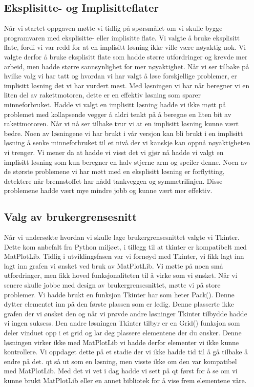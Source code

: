 \subsection{Eksplisitte- og Implisitteflater}
Når vi startet oppgaven møtte vi tidlig på spørsmålet om vi skulle bygge programvaren med eksplisitte- eller implisitte flate. Vi valgte å bruke eksplisitt flate, fordi vi var redd for at en implisitt løsning ikke ville være nøyaktig nok. Vi valgte derfor å bruke eksplisitt flate som hadde større utfordringer og krevde mer arbeid, men hadde større sannsynlighet for mer nøyaktighet. Når vi ser tilbake på hvilke valg vi har tatt og hvordan vi har valgt å løse forskjellige problemer, er implisitt løsning det vi har vurdert mest. Med løsningen vi har når beregner vi en liten del av rakettmotoren, dette er en effektiv løsning som sparer minneforbruket. Hadde vi valgt en implisitt løsning hadde vi ikke møtt på problemet med kollapsende vegger å aldri tenkt på å beregne en liten bit av rakettmotoren. Når vi nå ser tilbake trur vi at en implisitt løsning kunne vært bedre. Noen av løsningene vi har brukt i vår versjon kan bli brukt i en implisitt løsning å senke minneforbruket til et nivå der vi kanskje kan oppnå nøyaktigheten vi trenger. Vi mener da at hadde vi visst det vi gjør nå hadde vi valgt en implisitt løsning som kun beregner en halv stjerne arm og speiler denne. Noen av de største problemene vi har møtt med en eksplisitt løsning er forflytting, detektere når brennstoffet har nådd tankveggen og symmetrilinjen. Disse problemene hadde vært mye mindre jobb og kunne vært mer effektiv.


\subsection{Valg av brukergrensesnitt}
Når vi undersøkte hvordan vi skulle lage brukergrensesnittet valgte vi Tkinter. Dette kom anbefalt fra Python miljøet, i tillegg til at tkinter er kompatibelt med MatPlotLib. Tidlig i utviklingsfasen var vi fornøyd med Tkinter, vi fikk lagt inn lagt inn grafen vi ønsket ved bruk av MatPlotLib. Vi møtte på noen små utfordringer, men fikk hoved funksjonaliteten til å virke som vi ønsket. Når vi senere skulle jobbe med design av brukergrensesnittet, møtte vi på store problemer. Vi hadde brukt en funksjon Tkinter har som heter Pack(). Denne dytter elementet inn på den første plassen som er ledig. Denne plasserte ikke grafen der vi ønsket den og når vi prøvde andre løsninger Tkinter tilbydde hadde vi ingen suksess. Den andre løsningen Tkinter tilbyr er en Grid() funksjon som deler vinduet opp i et grid og lar deg plassere elementene der du ønsker. Denne løsningen virker ikke med MatPlotLib vi hadde derfor elementer vi ikke kunne kontrollere. Vi oppdaget dette på et stadie der vi ikke hadde tid til å gå tilbake å endre på det. qt så ut som en løsning, men visste ikke om den var kompatibel med MatPlotLib. Med det vi vet i dag hadde vi sett på qt først for å se om vi kunne brukt MatPlotLib eller en annet bibliotek for å vise frem elementene våre.






